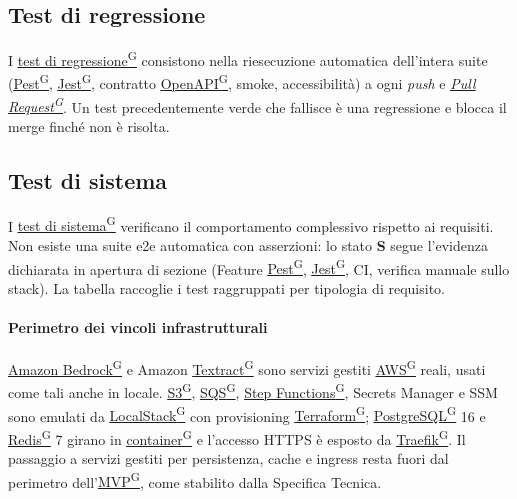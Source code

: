 \documentclass[a4paper,12pt]{article}
\providecommand{\glslink}[2]{\href{https://alittlebyte-19.github.io/Documentazione/glossario.html\#gls-#1}{\underline{#2}\textsuperscript{\scriptsize G}}}
\begin{document}
\subsection{Test di regressione}
I \glslink{test-di-regressione}{test di regressione} consistono nella riesecuzione automatica dell'intera suite (\glslink{pest}{Pest}, \glslink{jest}{Jest}, contratto \glslink{openapi}{OpenAPI}, smoke, accessibilità) a ogni \textit{push} e \textit{\glslink{pull-request}{Pull Request}}. Un test precedentemente verde che fallisce è una regressione e blocca il merge finché non è risolta.

\subsection{Test di sistema}
I \glslink{test-di-sistema}{test di sistema} verificano il comportamento complessivo rispetto ai requisiti. Non esiste una suite e2e automatica con asserzioni: lo stato \textbf{S} segue l'evidenza dichiarata in apertura di sezione (Feature \glslink{pest}{Pest}, \glslink{jest}{Jest}, CI, verifica manuale sullo stack). La tabella raccoglie i test raggruppati per tipologia di requisito.

\paragraph*{Perimetro dei vincoli infrastrutturali}
\glslink{amazon-bedrock}{Amazon Bedrock} e Amazon \glslink{textract}{Textract} sono servizi gestiti \glslink{aws}{AWS} reali, usati come tali anche in locale. \glslink{s3-simple-storage-service}{S3}, \glslink{sqs-simple-queue-service}{SQS}, \glslink{step-functions}{Step Functions}, Secrets Manager e SSM sono emulati da \glslink{localstack}{LocalStack} con provisioning \glslink{terraform}{Terraform}; \glslink{postgresql}{PostgreSQL} 16 e \glslink{redis}{Redis} 7 girano in \glslink{container}{container} e l'accesso HTTPS è esposto da \glslink{traefik}{Traefik}. Il passaggio a servizi gestiti per persistenza, cache e ingress resta fuori dal perimetro dell'\glslink{mvp-minimum-viable-product}{MVP}, come stabilito dalla Specifica Tecnica.
\end{document}
